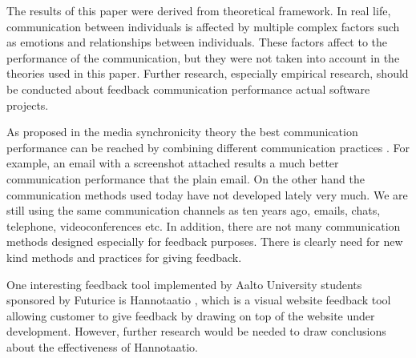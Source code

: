 \documentclass[conference]{IEEEtran}
\begin{document}
The results of this paper were derived from theoretical framework. In real life, communication between individuals is affected by multiple complex factors such as emotions and relationships between individuals. These factors affect to the performance of the communication, but they were not taken into account in the theories used in this paper. Further research, especially empirical research, should be conducted about feedback communication performance actual software projects.

As proposed in the media synchronicity theory the best communication performance can be reached by combining different communication practices \cite{2008dennis}. For example, an email with a screenshot attached results a much better communication performance that the plain email. On the other hand the communication methods used today have not developed lately very much. We are still using the same communication channels as ten years ago, emails, chats, telephone, videoconferences etc. In addition, there are not many communication methods designed especially for feedback purposes. There is clearly need for new kind methods and practices for giving feedback.

One interesting feedback tool implemented by Aalto University students sponsored by Futurice is Hannotaatio \cite{hannotaatio}, which is a visual website feedback tool allowing customer to give feedback by drawing on top of the website under development. However, further research would be needed to draw conclusions about the effectiveness of Hannotaatio.

%
%
\end{document}
